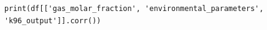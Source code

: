 \begin{lstlisting}[caption=Correlation matrix., label=lst:corr]
print(df[['gas_molar_fraction', 'environmental_parameters', 'k96_output']].corr())
\end{lstlisting}